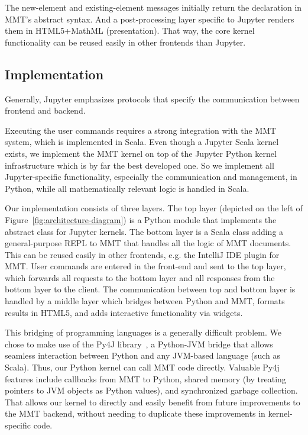 The new-element and existing-element messages initially return the declaration in MMT's abstract syntax.
And a post-processing layer specific to Jupyter renders them in HTML5+MathML (presentation).
That way, the core kernel functionality can be reused easily in other frontends than Jupyter.

\subsection{Implementation}\label{sec:kernel:impl}

Generally, Jupyter emphasizes protocols that specify the communication between frontend and backend. 

Executing the user commands requires a strong integration with the MMT system, which is implemented in Scala.
Even though a Jupyter Scala kernel exists, we implement the MMT kernel on top of the Jupyter Python kernel infrastructure which is by far the best developed one. 
So we implement all Jupyter-specific functionality, especially the communication and management, in Python, while all mathematically relevant logic is handled in Scala.

Our implementation consists of three layers.
The top layer (depicted on the left of Figure~\ref{fig:architecture-diagram}) is a Python module that implements the abstract class for Jupyter kernels.
The bottom layer is a Scala class adding a general-purpose REPL to MMT that handles all the logic of MMT documents.
This can be reused easily in other frontends, e.g. the IntelliJ IDE plugin for MMT.
User commands are entered in the front-end and sent to the top layer, which forwards all requests to the bottom layer and all responses from the bottom layer to the client.
The communication between top and bottom layer is handled by a middle layer which bridges between Python and MMT, formats results in HTML5, and adds interactive functionality via widgets.


This bridging of programming languages is a generally difficult problem. 
We chose to make use of the Py4J library~\cite{Py4J:on}, a Python-JVM bridge that allows seamless interaction between Python and any JVM-based language (such as Scala).
Thus, our Python kernel can call MMT code directly.
Valuable Py4j features include callbacks from MMT to Python, shared memory (by treating pointers to JVM objects as Python values), and synchronized garbage collection.
That allows our kernel to directly and easily benefit from future improvements to the MMT backend, without needing to duplicate these improvements in kernel-specific code. 

